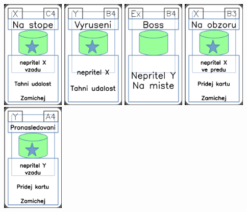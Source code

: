 \documentclass[a4paper]{article}
\begin{document}
	\includegraphics[width=3.0cm]{img-5_13}
	\includegraphics[width=3.0cm]{img-5_38}
	\includegraphics[width=3.0cm]{img-4_8}
	\includegraphics[width=3.0cm]{img-5_7}
	\includegraphics[width=3.0cm]{img-5_33}
\end{document}
